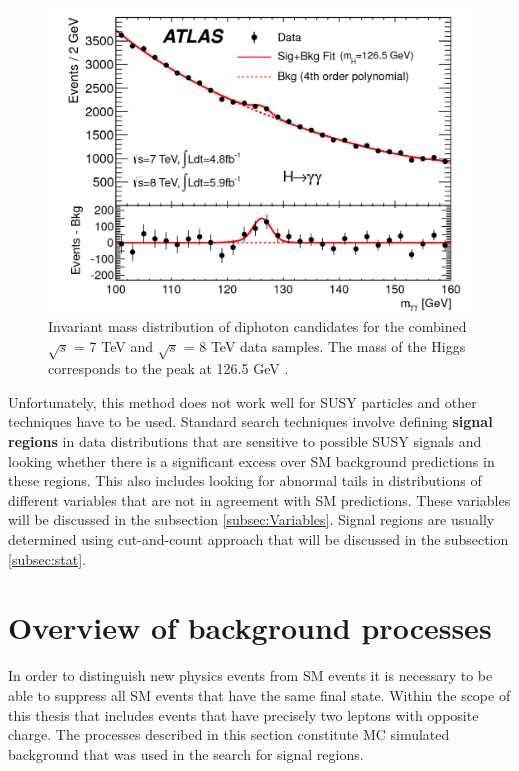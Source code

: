 \begin{figure}
	\centering
	\captionsetup{width=0.8\textwidth}
	\includegraphics[scale=0.2]{Chap3/figaux_004a}
	\caption[Invariant mass of diphoton events: discovery of the Higgs]{Invariant mass distribution of diphoton 				candidates for the combined $\sqrt{s}$ = 7 TeV and $\sqrt{s}$ = 8 TeV 			data samples. The mass of the Higgs corresponds to the peak at 126.5 				GeV \citep{Aad:2012tfa}.}
\end{figure}

Unfortunately, this method does not work well for SUSY particles and other techniques have to be used. Standard search techniques involve defining \textbf{signal regions} in data distributions that are sensitive to possible SUSY signals and looking whether there is a significant excess over SM background predictions in these regions. 
This also includes looking for abnormal tails in distributions of different variables that are not in agreement with SM predictions. These variables will be discussed in the subsection \ref{subsec:Variables}. Signal regions are usually determined using cut-and-count approach that will be discussed in the subsection \ref{subsec:stat}.

\section{Overview of background processes}
In order to distinguish new physics events from SM events it is necessary to be able to suppress all SM events that have the same final state. Within the scope of this thesis that includes events that have precisely two leptons with opposite charge. The processes described in this section constitute MC simulated background that was used in the search for signal regions.

